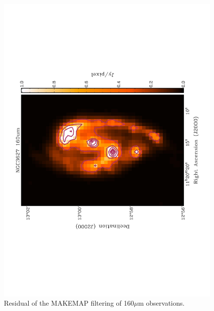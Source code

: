 \begin{figure}
  \centering
  \label{fig_160}
  \includegraphics[scale=0.5,angle=270]{obs_imgs/160_um.jpeg}
  \caption[NGC3627 160$\mu$m Observations]{Residual of the MAKEMAP filtering of 160$\mu$m observations.}
\end{figure}

